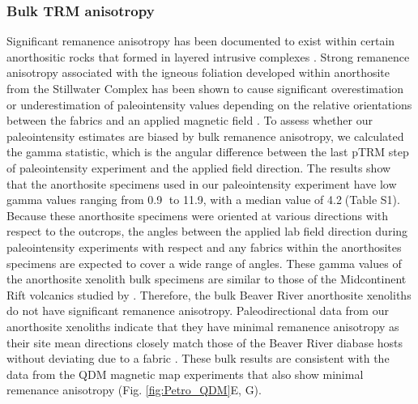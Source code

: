 \documentclass[9pt,twocolumn,twoside,lineno]{pnas-new}
\begin{document}
\subsubsection*{Bulk TRM anisotropy}
Significant remanence anisotropy has been documented to exist within certain anorthositic rocks that formed in layered intrusive complexes \cite{Selkin2000a, Feinberg2006a}. Strong remanence anisotropy associated with the igneous foliation developed within anorthosite from the Stillwater Complex has been shown to cause significant overestimation or underestimation of paleointensity values depending on the relative orientations between the fabrics and an applied magnetic field \cite{Selkin2000a}. To assess whether our paleointensity estimates are biased by bulk remanence anisotropy, we calculated the gamma statistic, which is the angular difference between the last pTRM step of paleointensity experiment and the applied field direction. The results show that the anorthosite specimens used in our paleointensity experiment have low gamma values ranging from 0.9\textdegree$\;$ to 11.9\textdegree, with a median value of 4.2\textdegree$\;$(Table S1). Because these anorthosite specimens were oriented at various directions with respect to the outcrops, the angles between the applied lab field direction during paleointensity experiments with respect and any fabrics within the anorthosites specimens are expected to cover a wide range of angles. These gamma values of the anorthosite xenolith bulk specimens are similar to those of the Midcontinent Rift volcanics studied by \citealp{Sprain2018a}. Therefore, the bulk Beaver River anorthosite xenoliths do not have significant remanence anisotropy. Paleodirectional data from our anorthosite xenoliths indicate that they have minimal remanence anisotropy as their site mean directions closely match those of the Beaver River diabase hosts without deviating due to a fabric \cite{Zhang2021b}. These bulk results are consistent with the data from the QDM magnetic map experiments that also show minimal remenance anisotropy (Fig. \ref{fig:Petro_QDM}E, G). 
\end{document}
